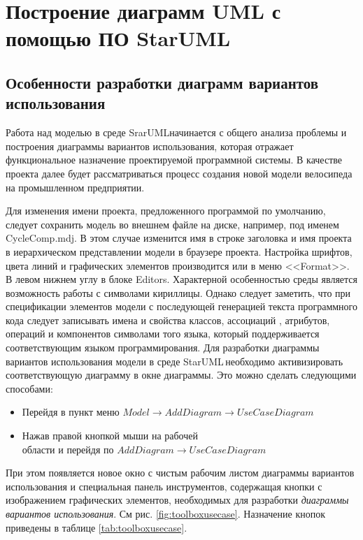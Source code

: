 \documentclass[a4paper,12pt]{extreport}
\newcommand{\staruml}{StarUML\,\tm}
\begin{document}
\chapter{Построение диаграмм UML с помощью ПО \staruml}

\section{Особенности разработки диаграмм вариантов использования}

Работа над моделью в среде SrarUML\tm начинается с общего
анализа проблемы и построения диаграммы вариантов использования,
которая отражает функциональное назначение проектируемой программной
системы.
В качестве проекта далее будет рассматриваться процесс создания новой модели велосипеда на промышленном предприятии.

Для изменения имени
проекта, предложенного программой по умолчанию, следует сохранить
модель во внешнем файле на диске, например, под именем CycleComp.mdj.
В этом случае изменится имя в строке заголовка и имя проекта в
иерархическом представлении модели в браузере проекта.
Настройка шрифтов, цвета линий и графических элементов
производится или в меню <<Format>>.
В левом нижнем углу в блоке Editors. Характерной особенностью среды является
возможность работы с символами кириллицы. Однако следует заметить,
что при спецификации элементов модели с последующей генерацией
текста программного кода следует записывать имена и свойства
классов, ассоциаций , атрибутов, операций и компонентов символами
того языка, который поддерживается соответствующим языком
программирования.
Для разработки диаграммы вариантов использования модели в среде
\staruml необходимо активизировать соответствующую
диаграмму в окне диаграммы. Это можно сделать следующими способами:
\begin{itemize}
	\item Перейдя в пункт меню $Model \to Add Diagram $$\to Use Case Diagram$
	
	\item Нажав правой кнопкой мыши на рабочей \\области и перейдя по $Add Diagram$$ \to Use Case Diagram$
\end{itemize}
При этом появляется новое окно с чистым рабочим листом диаграммы вариантов использования и специальная панель инструментов, содержащая кнопки с изображением графических элементов, необходимых для разработки \textit{диаграммы вариантов использования}. См рис. \ref{fig:toolboxusecase}. Назначение кнопок приведены в таблице \ref{tab:toolboxusecase}.
\end{document}
